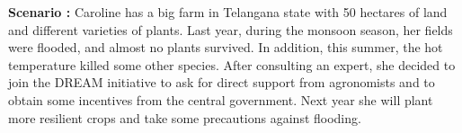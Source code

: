 \begin{flushleft}
\textbf{Scenario :} 
Caroline has a big farm in Telangana state with 50 hectares of land and different varieties of plants. Last year, during the monsoon season, her fields were flooded, and almost no plants survived. In addition, this summer, the hot temperature killed some other species.
After consulting an expert, she decided to join the DREAM initiative to ask for direct support from agronomists and to obtain some incentives from the central government.
Next year she will plant more resilient crops and take some precautions against flooding.
\end{flushleft}